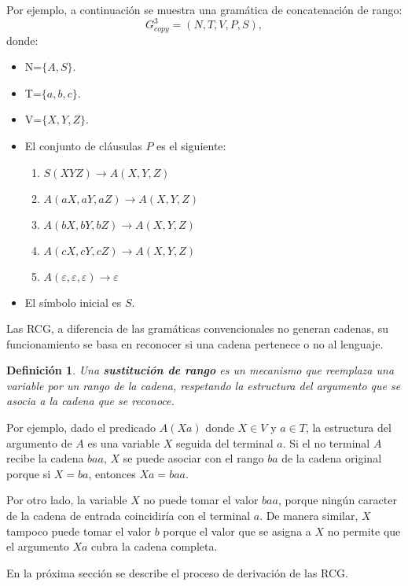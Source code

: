 \documentclass{article}
\newtheorem{definition}{Definición}
\begin{document}
Por ejemplo, a continuación se muestra una gramática de concatenación de rango:
\label{g_3copy}
\[
    G^3_{copy} = (N, T, V, P, S),
\]
donde:

\begin{itemize}
    \item  N=$\{A,S\}$.
    \item T=$\{a,b,c\}$.
    \item V=$\{X,Y,Z\}$.
    \item El conjunto de cláusulas $P$ es el siguiente:
          \begin{enumerate}
              \item $S(XYZ)\to A(X,Y,Z)$
              \item $A(aX,aY,aZ)\to A(X,Y,Z)$
              \item $A(bX,bY,bZ)\to A(X,Y,Z)$
              \item $A(cX,cY,cZ)\to A(X,Y,Z)$
              \item $A(\varepsilon,\varepsilon,\varepsilon)\to \varepsilon$
          \end{enumerate}
    \item El símbolo inicial es $S$.
\end{itemize}


Las RCG, a diferencia de las gramáticas convencionales no generan cadenas, su funcionamiento se basa en reconocer si una cadena pertenece o no al lenguaje.


\begin{definition}
    Una \textbf{sustitución de rango} es un mecanismo que reemplaza una variable por un
    rango de la cadena, respetando la estructura del argumento que se asocia a la cadena que se reconoce.
\end{definition}

Por ejemplo, dado el predicado $A(Xa)$ donde $X \in V$ y $a \in T$, la estructura del argumento de $A$ es una variable $X$ seguida del terminal $a$. Si el no terminal $A$ recibe la cadena $baa$, $X$ se puede asociar con el rango $ba$ de la cadena original porque si $X=ba$, entonces $Xa=baa$.

Por otro lado, la variable $X$ no puede tomar el valor $baa$, porque ningún caracter de la cadena de entrada coincidiría
con el terminal $a$. De manera similar, $X$ tampoco puede tomar el valor $b$ porque el valor que se asigna a $X$ no permite que el argumento $Xa$ cubra la cadena completa.

En la próxima sección se describe el proceso de derivación de las RCG.
\end{document}
